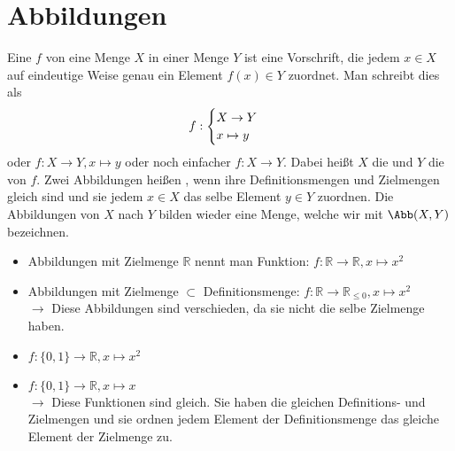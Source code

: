 \section{Abbildungen}

\begin{overview}[Abbildungen]
	Eine  $f$ von eine Menge $X$ in einer Menge $Y$ ist eine Vorschrift, die jedem $x \in X$
	auf eindeutige Weise genau ein Element $f(x) \in Y$ zuordnet. Man schreibt dies als 
	\begin{align}
	f:
	\begin{cases}
	X \to Y \\ x \mapsto y
	\end{cases}\notag
	\end{align}
	oder $f: X \to Y, x \mapsto y$ oder noch einfacher $f: X \to Y$. Dabei heißt $X$ die
	 und $Y$ die  von $f$. Zwei Abbildungen heißen , wenn ihre
	Definitionsmengen und Zielmengen gleich sind und sie jedem $x \in X$ das selbe Element
	$y \in Y$ zuordnen. Die Abbildungen von $X$ nach $Y$ bilden wieder eine Menge, welche wir 
	mit $\Abb(X,Y)$ bezeichnen.
\end{overview}

\begin{example}
	\begin{itemize}
		\item Abbildungen mit Zielmenge $\mathbb R$ nennt man Funktion: $f: \mathbb R \to \mathbb
		R, x \mapsto x^2$
		\item Abbildungen mit Zielmenge $\subset$ Definitionsmenge: $f: \mathbb R \to \mathbb
		R_{\le 0}, x \mapsto x^2$ \\
		$\to$ Diese Abbildungen sind verschieden, da sie nicht die selbe Zielmenge haben.
		\item $f: \{0,1\} \to \mathbb R, x \mapsto x^2$
		\item $f: \{0,1\} \to \mathbb R, x \mapsto x$ \\
		$\to$ Diese Funktionen sind gleich. Sie haben die gleichen Definitions- und Zielmengen 
		und sie ordnen jedem Element der Definitionsmenge das gleiche Element der Zielmenge zu.
	\end{itemize}
\end{example}

